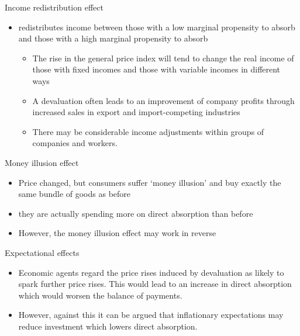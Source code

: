 \documentclass[10pt,hyperref={CJKbookmarks=true},xcolor=dvipsnames,aspectratio=169]{beamer}
\begin{document}
\begin{frame}{Income redistribution effect}



\begin{itemize}
\item redistributes income between those with a low marginal propensity
to absorb and those with a high marginal propensity to absorb

\begin{itemize}
\item The rise in the general price index will tend to change the real income
of those with fixed incomes and those with variable incomes in different
ways
\item A devaluation often leads to an improvement of company profits through
increased sales in export and import-competing industries
\item There may be considerable income adjustments within groups of companies
and workers. 
\end{itemize}
\end{itemize}
\end{frame}

\begin{frame}{Money illusion effect}

\begin{itemize}
\item Price changed, but consumers suffer ‘money illusion’ and buy exactly
the same bundle of goods as before
\item they are actually spending more on direct absorption than before
\item However, the money illusion effect may work in reverse
\end{itemize}
\end{frame}

\begin{frame}{Expectational effects}

\begin{itemize}
\item Economic agents regard the price rises induced by devaluation as likely
to spark further price rises. This would lead to an increase in direct
absorption which would worsen the balance of payments.
\item However, against this it can be argued that inflationary expectations
may reduce investment which lowers direct absorption.
\end{itemize}
\end{frame}
\end{document}
